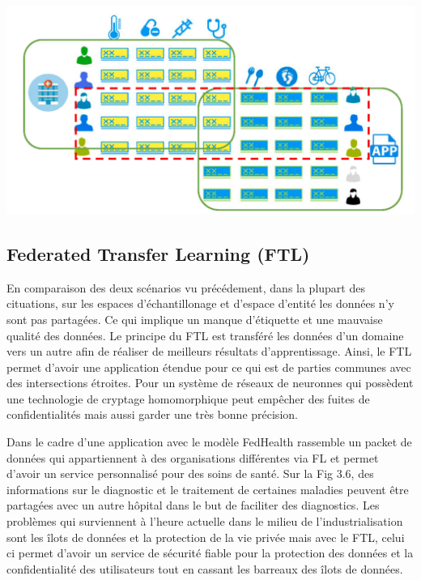 \documentclass[12pt,a4paper]{report}
\begin{document}
\begin{center}
	\includegraphics[scale=0.2]{fl_vertical}
	\label{fig1}
\end{center}


\subsection{Federated Transfer Learning (FTL)}

En comparaison des deux scénarios vu précédement, dans la plupart des cituations, sur les espaces d'échantillonage et d'espace d'entité les données n'y sont pas partagées. Ce qui implique un manque d'étiquette et une mauvaise qualité des données. Le principe du FTL est transféré les données d'un domaine vers un autre afin de réaliser de meilleurs résultats d'apprentissage. Ainsi, le FTL permet d'avoir une application étendue pour ce qui est de parties communes avec des intersections étroites. Pour un système de réseaux de neuronnes qui possèdent une technologie de cryptage homomorphique peut empêcher des fuites de confidentialités mais aussi garder une très bonne précision. 

Dans le cadre d'une application avec le modèle FedHealth rassemble un packet de données qui appartiennent à des organisations différentes via FL et permet d'avoir un service personnalisé pour des soins de santé. Sur la Fig 3.6, des informations sur le diagnostic et le traitement de certaines maladies peuvent être partagées avec un autre hôpital dans le but de faciliter des diagnostics. Les problèmes qui surviennent à l'heure actuelle dans le milieu de l'industrialisation sont les îlots de données et la protection de la vie privée mais avec le FTL, celui ci permet d'avoir un service de sécurité fiable pour la protection des données et la confidentialité des utilisateurs tout en cassant les barreaux des îlots de données.
\end{document}
